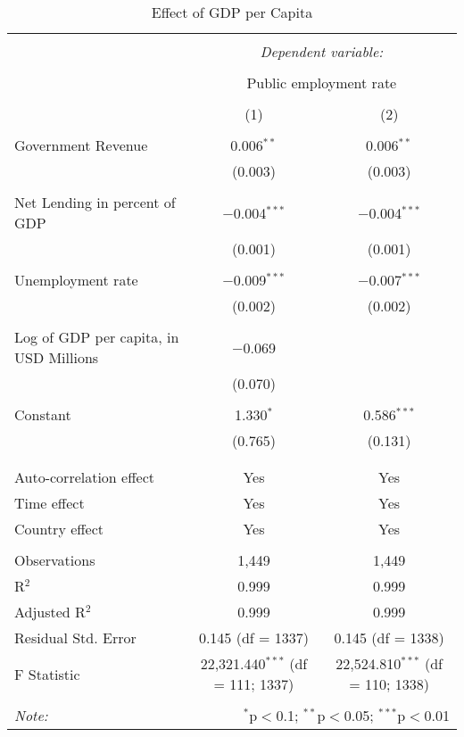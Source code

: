 
\begin{table}[!htbp] \centering 
  \caption{Effect of GDP per Capita} 
  \label{} 
\begin{tabular}{@{\extracolsep{5pt}}lcc} 
\\[-1.8ex]\hline 
\hline \\[-1.8ex] 
 & \multicolumn{2}{c}{\textit{Dependent variable:}} \\ 
\cline{2-3} 
\\[-1.8ex] & \multicolumn{2}{c}{Public employment rate} \\ 
\\[-1.8ex] & (1) & (2)\\ 
\hline \\[-1.8ex] 
 Government Revenue & 0.006$^{**}$ & 0.006$^{**}$ \\ 
  & (0.003) & (0.003) \\ 
  & & \\ 
 Net Lending in percent of GDP & $-$0.004$^{***}$ & $-$0.004$^{***}$ \\ 
  & (0.001) & (0.001) \\ 
  & & \\ 
 Unemployment rate & $-$0.009$^{***}$ & $-$0.007$^{***}$ \\ 
  & (0.002) & (0.002) \\ 
  & & \\ 
 Log of GDP per capita, in USD Millions & $-$0.069 &  \\ 
  & (0.070) &  \\ 
  & & \\ 
 Constant & 1.330$^{*}$ & 0.586$^{***}$ \\ 
  & (0.765) & (0.131) \\ 
  & & \\ 
\hline \\[-1.8ex] 
Auto-correlation effect & Yes & Yes \\ 
Time effect & Yes & Yes \\ 
Country effect & Yes & Yes \\ 
\hline \\[-1.8ex] 
Observations & 1,449 & 1,449 \\ 
R$^{2}$ & 0.999 & 0.999 \\ 
Adjusted R$^{2}$ & 0.999 & 0.999 \\ 
Residual Std. Error & 0.145 (df = 1337) & 0.145 (df = 1338) \\ 
F Statistic & 22,321.440$^{***}$ (df = 111; 1337) & 22,524.810$^{***}$ (df = 110; 1338) \\ 
\hline 
\hline \\[-1.8ex] 
\textit{Note:}  & \multicolumn{2}{r}{$^{*}$p$<$0.1; $^{**}$p$<$0.05; $^{***}$p$<$0.01} \\ 
\end{tabular} 
\end{table} 
